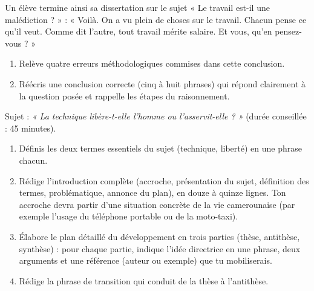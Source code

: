 \documentclass[11pt]{article}
\newcommand{\cle}[1]{{\popxbold\color{popdark}#1}}
\newcounter{popsec}
\newcounter{popsub}
\newcommand{\courssub}[1]{%
  \stepcounter{popsub}%
  \par\vspace{9pt}\noindent{\popxbold\fontsize{11.5}{13}\selectfont\color{popink}{\color{poporange}\thepopsec.\thepopsub}\hspace{6pt}#1}\par\nopagebreak\vspace{4pt}
}
\begin{document}
\begin{exercice}
Un élève termine ainsi sa dissertation sur le sujet « Le travail est-il une malédiction ? » : « Voilà. On a vu plein de choses sur le travail. Chacun pense ce qu'il veut. Comme dit l'autre, tout travail mérite salaire. Et vous, qu'en pensez-vous ? »
\begin{enumerate}
\item Relève quatre erreurs méthodologiques commises dans cette conclusion.
\item Réécris une conclusion correcte (cinq à huit phrases) qui répond clairement à la question posée et rappelle les étapes du raisonnement.
\end{enumerate}
\end{exercice}

\courssub{Je me prépare au Bac}

\begin{exercice}
Sujet : \emph{« La technique libère-t-elle l'homme ou l'asservit-elle ? »} (durée conseillée : 45 minutes).
\begin{enumerate}
\item Définis les deux termes essentiels du sujet (\cle{technique}, \cle{liberté}) en une phrase chacun.
\item Rédige l'introduction complète (accroche, présentation du sujet, définition des termes, problématique, annonce du plan), en douze à quinze lignes. Ton accroche devra partir d'une situation concrète de la vie camerounaise (par exemple l'usage du téléphone portable ou de la moto-taxi).
\item Élabore le plan détaillé du développement en trois parties (thèse, antithèse, synthèse) : pour chaque partie, indique l'idée directrice en une phrase, deux arguments et une référence (auteur ou exemple) que tu mobiliserais.
\item Rédige la phrase de transition qui conduit de la thèse à l'antithèse.
\end{enumerate}
\end{exercice}
\end{document}
